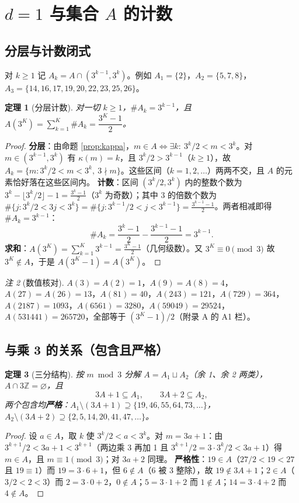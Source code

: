 \documentclass[11pt]{article}
\newtheorem{theorem}{定理}[section]
\theoremstyle{definition}\newtheorem{definition}[theorem]{定义}
\theoremstyle{definition}\newtheorem{conjecture}[theorem]{猜想}
\theoremstyle{remark}\newtheorem{remark}[theorem]{注}
\begin{document}
\section{$d=1$ 与集合 $A$ 的计数}
\subsection{分层与计数闭式}
对 $k\ge1$ 记 $A_k=A\cap(3^{k-1},3^k)$。例如 $A_1=\{2\}$，$A_2=\{5,7,8\}$，$A_3=\{14,16,17,19,20,22,23,25,26\}$。
\begin{theorem}[分层计数]\label{thm:count}
对一切 $k\ge1$，$\#A_k=3^{k-1}$，且 $A(3^K)=\sum_{k=1}^{K}\#A_k=\dfrac{3^K-1}{2}$。
\end{theorem}
\begin{proof}
\textbf{分层}：由命题 \ref{prop:kappa}，$m\in A\iff\exists k:\ 3^k/2<m<3^k$。对 $m\in(3^{k-1},3^k)$ 有 $\kappa(m)=k$，且 $3^k/2>3^{k-1}$（$k\ge1$），故 $A_k=\{m:3^k/2<m<3^k,\ 3\nmid m\}$。这些区间（$k=1,2,\dots$）两两不交，且 $A$ 的元素恰好落在这些区间内。
\textbf{计数}：区间 $(3^k/2,3^k)$ 内的整数个数为 $3^k-\lfloor3^k/2\rfloor-1=\frac{3^k-1}{2}$（$3^k$ 为奇数）；其中 3 的倍数个数为 $\#\{j:3^k/2<3j<3^k\}=\#\{j:3^{k-1}/2<j<3^{k-1}\}=\frac{3^{k-1}-1}{2}$。两者相减即得 $\#A_k=3^{k-1}$：
\[\#A_k=\frac{3^k-1}{2}-\frac{3^{k-1}-1}{2}=3^{k-1}.\]
\textbf{求和}：$A(3^K)=\sum_{k=1}^{K}3^{k-1}=\frac{3^K-1}{2}$（几何级数）。又 $3^K\equiv0\pmod3$ 故 $3^K\notin A$，于是 $A(3^K-1)=A(3^K)$。
\end{proof}
\begin{remark}[数值核对]\label{rem:vals}
$A(3)=A(2)=1$，$A(9)=A(8)=4$，$A(27)=A(26)=13$，$A(81)=40$，$A(243)=121$，$A(729)=364$，$A(2187)=1093$，$A(6561)=3280$，$A(59049)=29524$，$A(531441)=265720$，全部等于 $(3^K-1)/2$（附录 A 的 A1 栏）。
\end{remark}
\subsection{与乘 3 的关系（包含且严格）}
\begin{theorem}[三分结构]\label{thm:times3}
按 $m\bmod3$ 分解 $A=A_1\sqcup A_2$（余 1、余 2 两类），$A\cap3\mathbb{Z}=\varnothing$，且
\[3A+1\subseteq A_1,\qquad 3A+2\subseteq A_2,\]
两个包含均\textbf{严格}：$A_1\setminus(3A+1)\supseteq\{19,46,55,64,73,\dots\}$，$A_2\setminus(3A+2)\supseteq\{2,5,14,20,41,47,\dots\}$。
\end{theorem}
\begin{proof}
设 $a\in A$，取 $k$ 使 $3^k/2<a<3^k$。对 $m=3a+1$：由 $3^{k+1}/2<3a+1<3^{k+1}$（两边乘 3 再加 1 且 $3^{k+1}/2=3\cdot3^k/2<3a+1$）得 $m\in A$，且 $m\equiv1\pmod3$；对 $3a+2$ 同理。
\textbf{严格性}：$19\in A$（$27/2<19<27$ 且 $19\equiv1$）而 $19=3\cdot6+1$，但 $6\notin A$（$6$ 被 3 整除），故 $19\notin3A+1$；$2\in A$（$3/2<2<3$）而 $2=3\cdot0+2$，$0\notin A$；$5=3\cdot1+2$ 而 $1\notin A$；$14=3\cdot4+2$ 而 $4\notin A$。
\end{proof}
\end{document}
